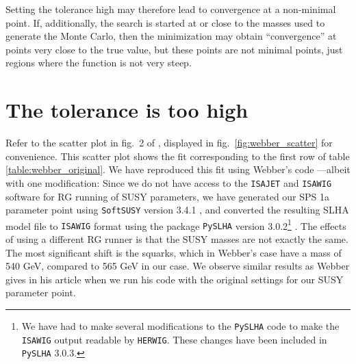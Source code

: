\documentclass[twoside,english]{uiofysmaster}
\begin{document}
Setting the tolerance high may therefore lead to convergence at a non-minimal point. If, additionally, the search is started at or close to the masses used to generate the Monte Carlo, then the minimization may obtain ``convergence'' at points very close to the true value, but these points are not minimal points, just regions where the function is not very steep.

\section{The tolerance is too high}

Refer to the scatter plot in fig.\ 2 of \cite{Webber:2009vm}, displayed in fig.\ \ref{fig:webber_scatter} for convenience. This scatter plot shows the fit corresponding to the first row of table \ref{table:webber_original}. We have reproduced this fit using Webber's code \cite{Webber:epost} ---albeit with one modification: Since we do not have access to the {\tt ISAJET} and {\tt ISAWIG} software for RG running of SUSY parameters, we have generated our SPS 1a parameter point using {\tt SoftSUSY} version 3.4.1 \cite{Allanach:2001kg}, and converted the resulting SLHA \cite{Skands:2003cj} model file to {\tt ISAWIG} format using the package {\tt PySLHA} version 3.0.2\footnote{We have had to make several modifications to the {\tt PySLHA} code to make the {\tt ISAWIG} output readable by {\tt HERWIG}. These changes have been included in {\tt PySLHA} 3.0.3.} \cite{Buckley:2013jua}. The effects of using a different RG runner is that the SUSY masses are not exactly the same. The most significant shift is the squarks, which in Webber's case have a mass of 540 GeV, compared to 565 GeV in our case. We observe similar results as Webber gives in his article when we run his code with the original settings for our SUSY parameter point. 
\end{document}
